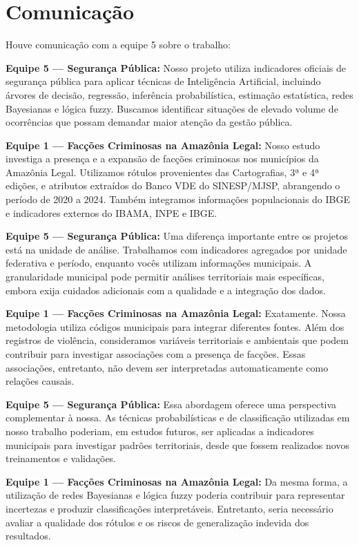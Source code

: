 \documentclass[10pt,a4paper,twocolumn]{article}
\begin{document}
\section{Comunicação}

Houve comunicação com a equipe 5 sobre o trabalho:

\medskip
\noindent\textbf{Equipe 5 --- Segurança Pública:} Nosso projeto utiliza indicadores oficiais
de segurança pública para aplicar técnicas de Inteligência Artificial, incluindo árvores de
decisão, regressão, inferência probabilística, estimação estatística, redes Bayesianas e
lógica fuzzy. Buscamos identificar situações de elevado volume de ocorrências que possam
demandar maior atenção da gestão pública.

\smallskip
\noindent\textbf{Equipe 1 --- Facções Criminosas na Amazônia Legal:} Nosso estudo investiga a
presença e a expansão de facções criminosas nos municípios da Amazônia Legal. Utilizamos rótulos
provenientes das Cartografias, 3ª e 4ª edições, e atributos extraídos do Banco VDE do
SINESP/MJSP, abrangendo o período de 2020 a 2024. Também integramos informações
populacionais do IBGE e indicadores externos do IBAMA, INPE e IBGE.

\smallskip
\noindent\textbf{Equipe 5 --- Segurança Pública:} Uma diferença importante entre os projetos
está na unidade de análise. Trabalhamos com indicadores agregados por unidade federativa e
período, enquanto vocês utilizam informações municipais. A granularidade municipal pode
permitir análises territoriais mais específicas, embora exija cuidados adicionais com a
qualidade e a integração dos dados.

\smallskip
\noindent\textbf{Equipe 1 --- Facções Criminosas na Amazônia Legal:} Exatamente. Nossa metodologia
utiliza códigos municipais para integrar diferentes fontes. Além dos registros de violência,
consideramos variáveis territoriais e ambientais que podem contribuir para investigar
associações com a presença de facções. Essas associações, entretanto, não devem ser
interpretadas automaticamente como relações causais.

\smallskip
\noindent\textbf{Equipe 5 --- Segurança Pública:} Essa abordagem oferece uma perspectiva
complementar à nossa. As técnicas probabilísticas e de classificação utilizadas em nosso
trabalho poderiam, em estudos futuros, ser aplicadas a indicadores municipais para
investigar padrões territoriais, desde que fossem realizados novos treinamentos e
validações.

\smallskip
\noindent\textbf{Equipe 1 --- Facções Criminosas na Amazônia Legal:} Da mesma forma, a utilização
de redes Bayesianas e lógica fuzzy poderia contribuir para representar incertezas e produzir
classificações interpretáveis. Entretanto, seria necessário avaliar a qualidade dos rótulos
e os riscos de generalização indevida dos resultados.
\end{document}

